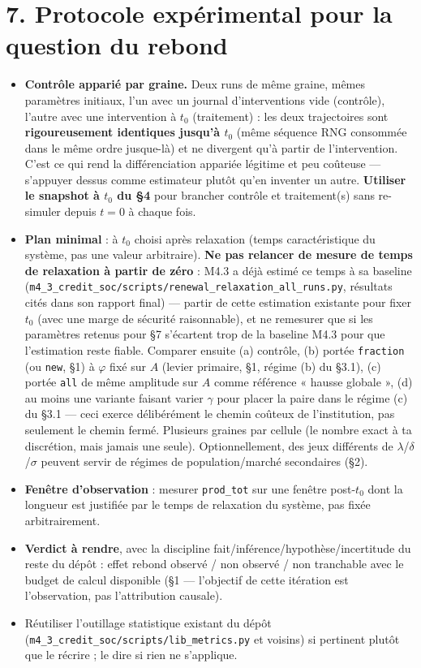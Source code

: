 \documentclass[11pt,a4paper]{article}
\newcommand{\code}[1]{\texttt{#1}}
\begin{document}
\section*{7. Protocole expérimental pour la question du rebond}

\begin{itemize}
\item \textbf{Contrôle apparié par graine.} Deux runs de même graine,
  mêmes paramètres initiaux, l'un avec un journal d'interventions vide
  (contrôle), l'autre avec une intervention à $t_0$ (traitement) : les
  deux trajectoires sont \textbf{rigoureusement identiques jusqu'à
  $t_0$} (même séquence RNG consommée dans le même ordre jusque-là) et
  ne divergent qu'à partir de l'intervention. C'est ce qui rend la
  différenciation appariée légitime et peu coûteuse --- s'appuyer dessus
  comme estimateur plutôt qu'en inventer un autre. \textbf{Utiliser le
  snapshot à $t_0$ du \S4} pour brancher contrôle et traitement(s) sans
  re-simuler depuis $t=0$ à chaque fois.
\item \textbf{Plan minimal} : à $t_0$ choisi après relaxation (temps
  caractéristique du système, pas une valeur arbitraire). \textbf{Ne pas
  relancer de mesure de temps de relaxation à partir de zéro} : M4.3 a
  déjà estimé ce temps à sa baseline
  (\code{m4\_3\_credit\_soc/scripts/renewal\_relaxation\_all\_runs.py},
  résultats cités dans son rapport final) --- partir de cette estimation
  existante pour fixer $t_0$ (avec une marge de sécurité raisonnable), et
  ne remesurer que si les paramètres retenus pour \S7 s'écartent trop de
  la baseline M4.3 pour que l'estimation reste fiable. Comparer ensuite
  (a) contrôle, (b) portée \code{fraction} (ou \code{new}, \S1) à
  $\varphi$ fixé sur $A$ (levier primaire, \S1, régime (b) du \S3.1),
  (c) portée \code{all} de même amplitude sur $A$ comme référence
  « hausse globale », (d) au moins une variante faisant varier $\gamma$
  pour placer la paire dans le régime (c) du \S3.1 --- ceci exerce
  délibérément le chemin coûteux de l'institution, pas seulement le
  chemin fermé. Plusieurs graines par cellule (le nombre exact à ta
  discrétion, mais jamais une seule). Optionnellement, des jeux
  différents de $\lambda$/$\delta$/$\sigma$ peuvent servir de régimes de
  population/marché secondaires (\S2).
\item \textbf{Fenêtre d'observation} : mesurer \code{prod\_tot} sur une
  fenêtre post-$t_0$ dont la longueur est justifiée par le temps de
  relaxation du système, pas fixée arbitrairement.
\item \textbf{Verdict à rendre}, avec la discipline
  fait/inférence/hypothèse/incertitude du reste du dépôt : effet rebond
  observé / non observé / non tranchable avec le budget de calcul
  disponible (\S1 --- l'objectif de cette itération est l'observation,
  pas l'attribution causale).
\item Réutiliser l'outillage statistique existant du dépôt
  (\code{m4\_3\_credit\_soc/scripts/lib\_metrics.py} et voisins) si
  pertinent plutôt que le récrire ; le dire si rien ne s'applique.
\end{itemize}
\end{document}

